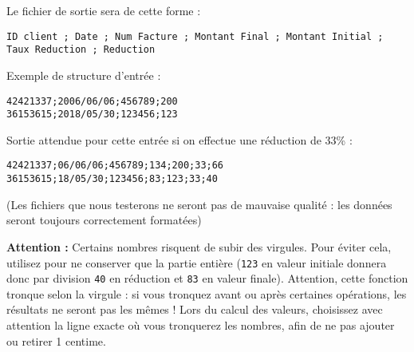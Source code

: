 %
%

\bigskip

\noindent Le fichier de sortie sera de cette forme : \\

\lstset{language=sh,basicstyle=\ttfamily \footnotesize}
\begin{lstlisting}[frame=single,title={Sortie attendue}]
ID client ; Date ; Num Facture ; Montant Final ; Montant Initial ; Taux Reduction ; Reduction
\end{lstlisting}

\bigskip

\noindent Exemple de structure d'entrée :

\lstset{language=sh}
\begin{lstlisting}[frame=single,title={Exemple de données en entrée}]
42421337;2006/06/06;456789;200
36153615;2018/05/30;123456;123
\end{lstlisting}

\bigskip

\noindent Sortie attendue pour cette entrée si on effectue une réduction de 33\% :

\lstset{language=sh}
\begin{lstlisting}[frame=single,title={Sortie attendue pour l'entrée précédente avec 33\% de réduction}]
42421337;06/06/06;456789;134;200;33;66
36153615;18/05/30;123456;83;123;33;40
\end{lstlisting}

\bigskip

\noindent (Les fichiers que nous testerons ne seront pas de mauvaise qualité : les données seront toujours correctement formatées)

\bigskip

\begin{YellowBox}
\textbf{Attention :} Certains nombres risquent de subir des virgules.
Pour éviter cela, utilisez  pour ne conserver que la partie entière (\texttt{123} en valeur initiale donnera donc par division \texttt{40} en réduction et \texttt{83} en valeur finale).
Attention, cette fonction tronque selon la virgule : si vous tronquez avant ou après certaines opérations, les résultats ne seront pas les mêmes !
Lors du calcul des valeurs, choisissez avec attention la ligne exacte où vous tronquerez les nombres, afin de ne pas ajouter ou retirer 1 centime.
\end{YellowBox}

